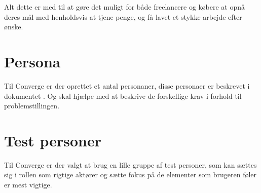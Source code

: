Alt dette er med til at gøre det muligt for både freelancere og købere at opnå deres mål med henholdsvis at tjene penge, og få lavet et stykke arbejde efter ønske.

\section{Persona}

Til Converge er der oprettet et antal personaner, disse personaer er beskrevet i dokumentet . Og skal hjælpe med at beskrive de forskellige krav i forhold til problemstillingen.

\section{Test personer}

Til Converge er der valgt at brug en lille gruppe af test personer, som kan sættes sig i rollen som rigtige aktører og sætte fokus på de elementer som brugeren føler er mest vigtige.